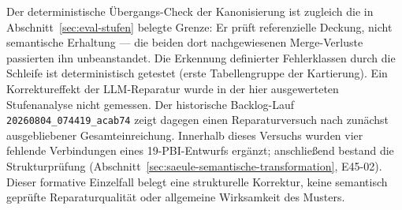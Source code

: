 Der deterministische Übergangs-Check der Kanonisierung ist
zugleich die in Abschnitt~\ref{sec:eval-stufen} belegte Grenze:
Er prüft referenzielle Deckung, nicht semantische Erhaltung ---
die beiden dort nachgewiesenen Merge-Verluste passierten ihn
unbeanstandet. Die Erkennung definierter Fehlerklassen durch die
Schleife ist deterministisch getestet (erste Tabellengruppe der
Kartierung). Ein Korrektureffekt der LLM-Reparatur wurde in der
hier ausgewerteten Stufenanalyse nicht gemessen. Der historische
Backlog-Lauf \texttt{20260804\_074419\_acab74} zeigt dagegen einen
Reparaturversuch nach zunächst ausgebliebener Gesamteinreichung.
Innerhalb dieses Versuchs wurden vier fehlende Verbindungen eines
19-PBI-Entwurfs ergänzt; anschließend bestand die Strukturprüfung
(Abschnitt~\ref{sec:saeule-semantische-transformation}, E45-02).
Dieser formative Einzelfall belegt eine strukturelle Korrektur,
keine semantisch geprüfte Reparaturqualität oder allgemeine
Wirksamkeit des Musters.
